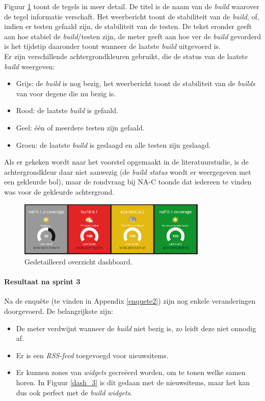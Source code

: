 \documentclass[10pt,a4paper]{article}
\begin{document}
Figuur \ref{dash_2} toont de tegels in meer detail. De titel is de naam van de \textit{build} waarover de tegel informatie verschaft. Het weerbericht toont de stabiliteit van de \textit{build}, of, indien er testen gefaald zijn, de stabiliteit van de testen. De tekst eronder geeft aan hoe stabiel de \textit{build}/testen zijn, de meter geeft aan hoe ver de \textit{build} gevorderd is het tijdstip daaronder toont wanneer de laatste \textit{build} uitgevoerd is.\\
Er zijn verschillende achtergrondkleuren gebruikt, die de status van de laatste \textit{build} weergeven:
\begin{itemize}
\item Grijs: de \textit{build} is nog bezig, het weerbericht toont de stabiliteit van de \textit{builds} van voor degene die nu bezig is.
\item Rood: de laatste \textit{build} is gefaald.
\item Geel: \'e\'en of meerdere testen zijn gefaald.
\item Groen: de laatste \textit{build} is geslaagd en alle testen zijn geslaagd. 
\end{itemize}
Als er gekeken wordt naar het voorstel opgemaakt in de literatuurstudie, is de achtergrondkleur daar niet aanwezig (de \textit{\textit{build} status} wordt er weergegeven met een gekleurde bol), maar de rondvraag bij NA-C toonde dat iedereen te vinden was voor de gekleurde achtergrond.

\begin{figure}[ht!]
\centering
\includegraphics[width=90mm]{screenshot2.png}
\caption{Gedetailleerd overzicht dashboard.} 
\label{dash_2}
\end{figure}

\paragraph{Resultaat na sprint 3}
Na de enqu\^ete (te vinden in Appendix \ref{enquete2}) zijn nog enkele veranderingen doorgevoerd. De belangrijkste zijn:
\begin{itemize}
\item De meter verdwijnt wanneer de \textit{build} niet bezig is, zo leidt deze niet onnodig af.
\item Er is een \textit{RSS-feed} toegevoegd voor nieuwsitems.
\item Er kunnen zones van \textit{widgets} gecre\"eerd worden, om te tonen welke samen horen. In Figuur \ref{dash_3} is dit gedaan met de nieuwsitems, maar het kan dus ook perfect met de \textit{build widgets}.
\end{itemize}
\end{document}

